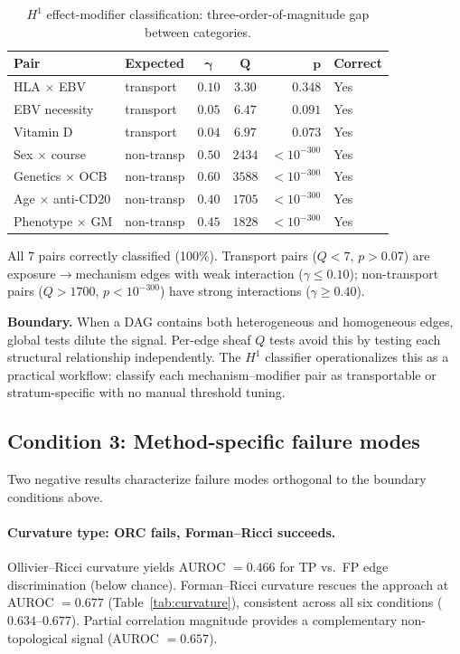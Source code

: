 \documentclass[11pt]{article}
\begin{document}
\begin{table}[t]
\centering
\caption{$H^1$ effect-modifier classification: three-order-of-magnitude gap between categories.}
\label{tab:h1}
\small
\begin{tabular}{@{}llccrl@{}}
\toprule
\textbf{Pair} & \textbf{Expected} & $\boldsymbol{\gamma}$ & $\boldsymbol{Q}$ & $\boldsymbol{p}$ & \textbf{Correct} \\
\midrule
HLA $\times$ EBV & transport & $0.10$ & $3.30$ & $0.348$ & Yes \\
EBV necessity & transport & $0.05$ & $6.47$ & $0.091$ & Yes \\
Vitamin D & transport & $0.04$ & $6.97$ & $0.073$ & Yes \\
\midrule
Sex $\times$ course & non-transp & $0.50$ & $2434$ & $< 10^{-300}$ & Yes \\
Genetics $\times$ OCB & non-transp & $0.60$ & $3588$ & $< 10^{-300}$ & Yes \\
Age $\times$ anti-CD20 & non-transp & $0.40$ & $1705$ & $< 10^{-300}$ & Yes \\
Phenotype $\times$ GM & non-transp & $0.45$ & $1828$ & $< 10^{-300}$ & Yes \\
\bottomrule
\end{tabular}
\end{table}

All 7 pairs correctly classified (100\%).
Transport pairs ($Q < 7$, $p > 0.07$) are exposure$\to$mechanism edges with weak interaction ($\gamma \leq 0.10$); non-transport pairs ($Q > 1700$, $p < 10^{-300}$) have strong interactions ($\gamma \geq 0.40$).

\textbf{Boundary.} When a DAG contains both heterogeneous and homogeneous edges, global tests dilute the signal.
Per-edge sheaf $Q$ tests avoid this by testing each structural relationship independently.
The $H^1$ classifier operationalizes this as a practical workflow: classify each mechanism--modifier pair as transportable or stratum-specific with no manual threshold tuning.

\subsection{Condition 3: Method-specific failure modes}
\label{sec:res-failures}

Two negative results characterize failure modes orthogonal to the boundary conditions above.

\paragraph{Curvature type: ORC fails, Forman--Ricci succeeds.}
Ollivier--Ricci curvature yields AUROC $= 0.466$ for TP vs.\ FP edge discrimination (below chance).
Forman--Ricci curvature rescues the approach at AUROC $= 0.677$ (Table~\ref{tab:curvature}), consistent across all six conditions ($0.634$--$0.677$).
Partial correlation magnitude provides a complementary non-topological signal (AUROC $= 0.657$).
\end{document}
